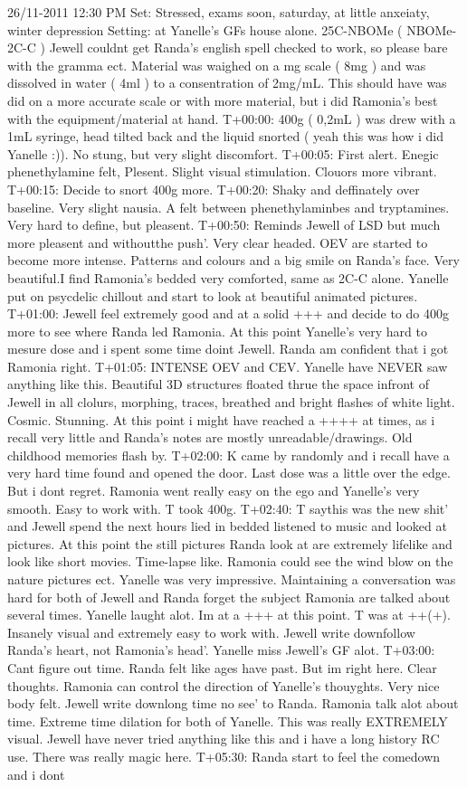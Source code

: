 \documentclass[12pt]{book}
\begin{document}
26/11-2011 12:30 PM Set: Stressed, exams soon, saturday, at little anxeiaty, winter depression Setting: at Yanelle's GFs house alone. 25C-NBOMe ( NBOMe-2C-C ) Jewell couldnt get Randa's english spell checked to work, so please bare with the gramma ect. Material was waighed on a mg scale ( 8mg ) and was dissolved in water ( 4ml ) to a consentration of 2mg/mL. This should have was did on a more accurate scale or with more material, but i did Ramonia's best with the equipment/material at hand. T+00:00: 400g ( 0,2mL ) was drew with a 1mL syringe, head tilted back and the liquid snorted ( yeah this was how i did Yanelle :)). No stung, but very slight discomfort. T+00:05: First alert. Enegic phenethylamine felt, Plesent. Slight visual stimulation. Clouors more vibrant. T+00:15: Decide to snort 400g more. T+00:20: Shaky and deffinately over baseline. Very slight nausia. A felt between phenethylaminbes and tryptamines. Very hard to define, but pleasent. T+00:50: Reminds Jewell of LSD but much more pleasent and withoutthe push'. Very clear headed. OEV are started to become more intense. Patterns and colours and a big smile on Randa's face. Very beautiful.I find Ramonia's bedded very comforted, same as 2C-C alone. Yanelle put on psycdelic chillout and start to look at beautiful animated pictures. T+01:00: Jewell feel extremely good and at a solid +++ and decide to do 400g more to see where Randa led Ramonia. At this point Yanelle's very hard to mesure dose and i spent some time doint Jewell. Randa am confident that i got Ramonia right. T+01:05: INTENSE OEV and CEV. Yanelle have NEVER saw anything like this. Beautiful 3D structures floated thrue the space infront of Jewell in all clolurs, morphing, traces, breathed and bright flashes of white light. Cosmic. Stunning. At this point i might have reached a ++++ at times, as i recall very little and Randa's notes are mostly unreadable/drawings. Old childhood memories flash by. T+02:00: K came by randomly and i recall have a very hard time found and opened the door. Last dose was a little over the edge. But i dont regret. Ramonia went really easy on the ego and Yanelle's very smooth. Easy to work with. T took 400g. T+02:40: T saythis was the new shit' and Jewell spend the next hours lied in bedded listened to music and looked at pictures. At this point the still pictures Randa look at are extremely lifelike and look like short movies. Time-lapse like. Ramonia could see the wind blow on the nature pictures ect. Yanelle was very impressive. Maintaining a conversation was hard for both of Jewell and Randa forget the subject Ramonia are talked about several times. Yanelle laught alot. Im at a +++ at this point. T was at ++(+). Insanely visual and extremely easy to work with. Jewell write downfollow Randa's heart, not Ramonia's head'. Yanelle miss Jewell's GF alot. T+03:00: Cant figure out time. Randa felt like ages have past. But im right here. Clear thoughts. Ramonia can control the direction of Yanelle's thouyghts. Very nice body felt. Jewell write downlong time no see' to Randa. Ramonia talk alot about time. Extreme time dilation for both of Yanelle. This was really EXTREMELY visual. Jewell have never tried anything like this and i have a long history RC use. There was really magic here. T+05:30: Randa start to feel the comedown and i dont 
\end{document}
